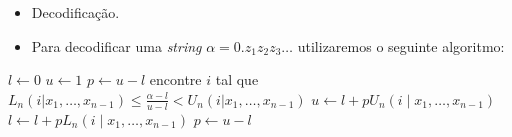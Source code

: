 \begin{frame}[allowframebreaks]
\begin{example}
  \end{example}

  \framebreak

  \begin{itemize}
  \item Decodificação.
  \item Para decodificar uma \textit{string} $\alpha=0.z_1 z_2 z_3 \ldots$ utilizaremos o seguinte algoritmo:
  \end{itemize}

  \begin{algorithmic}
  \State $l\gets 0$
  \State $u\gets 1$
  \State $p\gets u-l$ 
        \State encontre $i$ tal que
	$L_n(i|x_1, \ldots, x_{n-1}) \leq \frac{\alpha - l}{u - l} < U_n(i|x_1, \ldots, x_{n-1}) $ 
        \State $u\gets l + p U_n(i \mid x_1, \ldots, x_{n-1})$
        \State $l\gets l + p L_n(i \mid x_1, \ldots, x_{n-1})$
        \State $p\gets u - l$
  \EndWhile
  \end{algorithmic}

  \framebreak


\end{frame}
